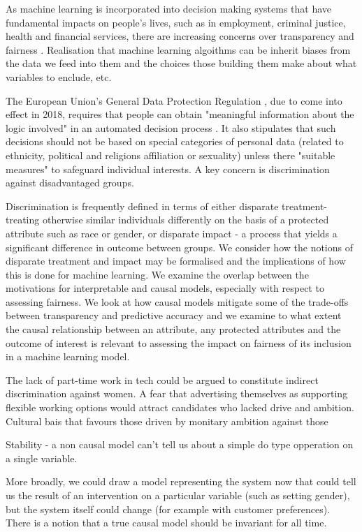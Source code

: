 \documentclass[11pt,a4paper,oneside]{book}
\theoremstyle{plain}
\theoremstyle{definition}
\begin{document}
As machine learning is incorporated into decision making systems that have fundamental impacts on people’s lives, such as in employment, criminal justice, health and financial services, there are increasing concerns over transparency and fairness \cite{WMD, etc}. Realisation that machine learning algoithms can be inherit biases from the data we feed into them and the choices those building them make about what variables to enclude, etc. 

The European Union’s General Data Protection Regulation \cite{Goodman2016}, due to come into effect in 2018, requires that people can obtain "meaningful information about the logic involved" in an automated decision process . It also stipulates that such decisions should not be based on special categories of personal data (related to ethnicity, political and religions affiliation or sexuality) unless there "suitable measures" to safeguard individual interests. A key concern is discrimination against disadvantaged groups. 

Discrimination is frequently defined in terms of either disparate treatment- treating otherwise similar individuals differently on the basis of a protected attribute such as race or gender, or disparate impact - a process that yields a significant difference in outcome between groups. We consider how the notions of disparate treatment and impact may be formalised and the implications of how this is done for machine learning. We examine the overlap between the motivations for interpretable and causal models, especially with respect to assessing fairness. We look at how causal models mitigate some of the trade-offs between transparency and predictive accuracy and we examine to what extent the causal relationship between an attribute, any protected attributes and the outcome of interest is relevant to assessing the impact on fairness of its inclusion in a machine learning model.

The lack of part-time work in tech could be argued to constitute indirect discrimination against women. 
A fear that advertising themselves as supporting flexible working options would attract candidates who lacked drive and ambition.
Cultural bais that favours those driven by monitary ambition against those 


Stability - a non causal model can't tell us about a simple do type opperation on  a single variable. 

More broadly, we could draw a model representing the system now that could tell us the result of an intervention on a particular variable (such as setting gender), but the system itself could change (for example with customer preferences). There is a notion that a true causal model should be invariant for all time.
\end{document}
